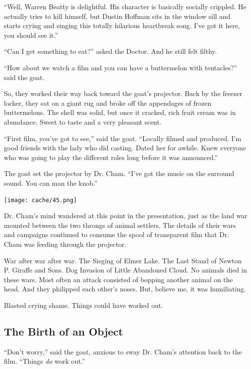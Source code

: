 \documentclass[12pt,twoside]{report}
\begin{document}
``Well, Warren Beatty is delightful.  His character is basically
socially crippled.  He actually tries to kill himself, but Dustin
Hoffman sits in the window sill and starts crying and singing this
totally hilarious heartbreak song.  I've got it here, you should see
it.''

``Can I get something to eat?'' asked the Doctor.  And he still felt
filthy.

``How about we watch a film and you can have a buttermelon with
tentacles?'' said the goat.

So, they worked their way back toward the goat's projector.  Back by
the freezer locker, they sat on a giant rug and broke off the
appendages of frozen buttermelons.  The shell was solid, but once it
cracked, rich fruit cream was in abundance.  Sweet to taste and a very
pleasant scent.

``First film, you've got to see,'' said the goat.  ``Locally filmed
and produced.  I'm good friends with the lady who did casting.  Dated
her for awhile.  Knew everyone who was going to play the different
roles long before it was announced.''

The goat set the projector by Dr. Cham.  ``I've got the music on the
surround sound. You can man the knob.''

	\texttt{[image: cache/45.png]}

Dr. Cham's mind wandered at this point in the presentation, just as
the land war mounted between the two throngs of animal settlers.  The
details of their wars and campaigns continued to consume the spool of
transparent film that Dr. Cham was feeding through the projector.

War after war after war.  The Sieging of Elmer Lake.  The Last Stand
of Newton P. Giraffe and Sons.  Dog Invasion of Little Abandoned
Cloud.  No animals died in these wars.  Most often an attack consisted
of bopping another animal on the head.  And they philipped each
other's noses.  But, believe me, it was humiliating.

Blasted crying shame.  Things could have worked out.



\subsection{The Birth of an Object}



``Don't worry,'' said the goat, anxious to sway Dr. Cham's attention
back to the film.  ``Things {\em do} work out.''
\end{document}
